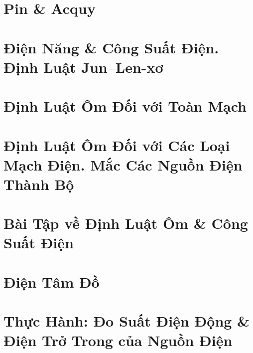 \documentclass[oneside]{book}
\numberwithin{equation}{section}
\begin{document}

\section{Pin \& Acquy}


\section{Điện Năng \& Công Suất Điện. Định Luật Jun--Len-xơ}


\section{Định Luật Ôm Đối với Toàn Mạch}


\section{Định Luật Ôm Đối với Các Loại Mạch Điện. Mắc Các Nguồn Điện Thành Bộ}


\section{Bài Tập về Định Luật Ôm \& Công Suất Điện}


\section{Điện Tâm Đồ}


\section{Thực Hành: Đo Suất Điện Động \& Điện Trở Trong của Nguồn Điện}
\end{document}
